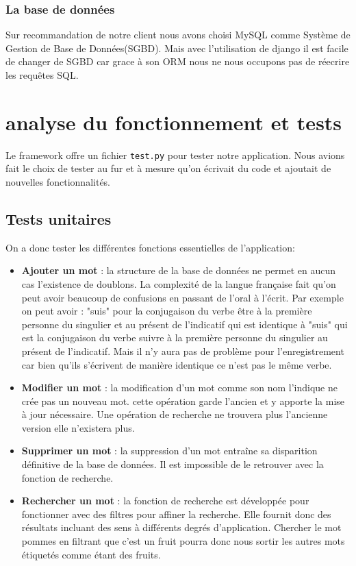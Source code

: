 \documentclass[a4paper, 12pt]{article}
\begin{document}
\subsubsection{La base de données}
Sur recommandation de notre client nous avons choisi MySQL comme Système de Gestion de Base de Données(SGBD). Mais avec l'utilisation de django il est facile de changer de SGBD car grace à son ORM nous ne nous occupons pas de réecrire les requêtes SQL. 

\section{analyse du fonctionnement et tests}
Le framework offre un fichier  \verb+test.py+  pour tester notre application. Nous avions fait le choix de tester au fur et à mesure qu'on écrivait du code et ajoutait de nouvelles fonctionnalités.
\subsection{Tests unitaires}
On a donc tester les différentes fonctions essentielles de l'application:
\begin{itemize}
    \item \textbf{Ajouter un mot} : la structure de la base de données ne permet en aucun cas l'existence de doublons. La complexité de la langue française fait qu'on peut avoir beaucoup de confusions en passant de l'oral à l'écrit. Par exemple on peut avoir : "suis" pour la conjugaison du verbe être à la première personne du singulier et  au présent de l'indicatif qui est identique à "suis" qui est la conjugaison du verbe suivre à la première personne du singulier au présent de l'indicatif. Mais il n'y aura pas de problème pour l'enregistrement car bien qu'ils s'écrivent de manière identique ce n'est pas le même verbe.
    \item \textbf{Modifier un mot }: la modification d'un mot comme son nom l'indique ne crée pas un nouveau mot. cette opération garde l'ancien et y apporte la mise à jour nécessaire. Une opération de recherche ne trouvera plus l'ancienne version elle n'existera plus.
    \item \textbf{Supprimer un mot }: la suppression d'un mot entraîne sa disparition définitive de la base de données. Il est impossible de le retrouver avec la fonction de recherche.
    \item \textbf{Rechercher un mot} : la fonction de recherche est développée pour fonctionner avec des filtres pour affiner la recherche. Elle fournit donc des résultats incluant des sens à différents degrés d'application. Chercher le mot pommes en filtrant que c'est un fruit pourra donc nous sortir les autres mots étiquetés comme étant des fruits.
\end{itemize}{}
\end{document}

